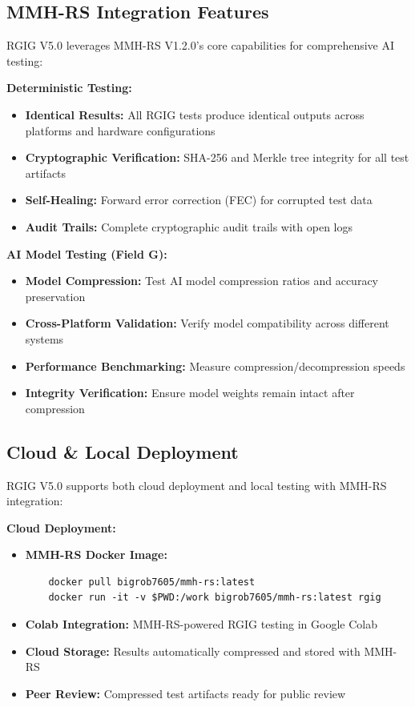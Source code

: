 \documentclass[11pt]{article}
\begin{document}
\subsection*{MMH-RS Integration Features}
RGIG V5.0 leverages MMH-RS V1.2.0's core capabilities for comprehensive AI testing:

\textbf{Deterministic Testing:}
\begin{itemize}
  \item \textbf{Identical Results:} All RGIG tests produce identical outputs across platforms and hardware configurations
  \item \textbf{Cryptographic Verification:} SHA-256 and Merkle tree integrity for all test artifacts
  \item \textbf{Self-Healing:} Forward error correction (FEC) for corrupted test data
  \item \textbf{Audit Trails:} Complete cryptographic audit trails with open logs
\end{itemize}

\textbf{AI Model Testing (Field G):}
\begin{itemize}
  \item \textbf{Model Compression:} Test AI model compression ratios and accuracy preservation
  \item \textbf{Cross-Platform Validation:} Verify model compatibility across different systems
  \item \textbf{Performance Benchmarking:} Measure compression/decompression speeds
  \item \textbf{Integrity Verification:} Ensure model weights remain intact after compression
\end{itemize}

\subsection*{Cloud \& Local Deployment}
RGIG V5.0 supports both cloud deployment and local testing with MMH-RS integration:

\textbf{Cloud Deployment:}
\begin{itemize}
  \item \textbf{MMH-RS Docker Image:}
    \begin{verbatim}
    docker pull bigrob7605/mmh-rs:latest
    docker run -it -v $PWD:/work bigrob7605/mmh-rs:latest rgig
    \end{verbatim}
  \item \textbf{Colab Integration:} MMH-RS-powered RGIG testing in Google Colab
  \item \textbf{Cloud Storage:} Results automatically compressed and stored with MMH-RS
  \item \textbf{Peer Review:} Compressed test artifacts ready for public review
\end{itemize}
\end{document}
